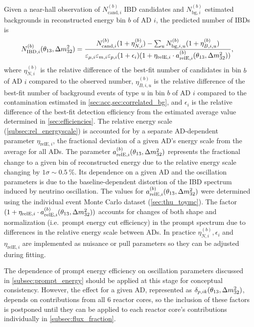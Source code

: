 Given a near-hall observation of $N_{\text{cand},i}^{(b)}$ IBD candidates
and $N_{\text{bg},i}^{(b)}$ estimated backgrounds in reconstructed energy bin $b$
of AD $i$,
the predicted number of IBDs is
\begin{equation}\label{eq:near_hall_bg_eff}
    N_{\text{IBD},i}^{(b)}(\theta_{13}, \Delta m^2_{32}) =
    \frac{N_{\text{cand},i}^{(b)}(1+\eta_{N,i}^{(b)})
        - \sum_u N_{\text{bg},i,u}^{(b)}(1+\eta_{B,i,u}^{(b)})}{
        \varepsilon_{\mu,i}\varepsilon_{m,i}\varepsilon_{p,i}(1+\epsilon_i)
        (1 + \eta_{\text{relE},i}\cdot a_{\text{relE},i}^{(b)}(\theta_{13}, \Delta m^2_{32}))
    },
\end{equation}
where $\eta_{N,i}^{(b)}$ is the relative difference
of the best-fit number of candidates in bin $b$ of AD $i$
compared to the observed number,
$\eta_{B,i,u}^{(b)}$ is the relative difference
of the best-fit number of background events of type $u$ in bin $b$ of AD $i$
compared to the contamination estimated in \cref{sec:acc,sec:correlated_bg},
and $\epsilon_i$ is the relative difference of the best-fit detection efficiency
from the estimated average value determined in \cref{sec:efficiencies}.
The relative energy scale (\cref{subsec:rel_energyscale})
is accounted for by a separate AD-dependent parameter $\eta_{\text{relE},i}$,
the fractional deviation of a given AD's energy scale
from the average for all ADs.
The parameter $a_{\text{relE},i}^{(b)}(\theta_{13}, \Delta m^2_{32})$
represents the fractional change to a given bin of reconstructed energy
due to the relative energy scale changing by $1\sigma \sim \SI{0.5}{\percent}$.
Its dependence on a given AD and the oscillation parameters is
due to the baseline-dependent distortion of the IBD spectrum
induced by neutrino oscillation.
The values for $a_{\text{relE},i}^{(b)}(\theta_{13}, \Delta m^2_{32})$ were determined using
the individual event Monte Carlo dataset (\cref{sec:thu_toymc}).
The factor $(1 + \eta_{\text{relE},i}\cdot a_{\text{relE},i}^{(b)}(\theta_{13},\Delta m^2_{32}))$
accounts for changes of
both shape and normalization (i.e.\ prompt energy cut efficiency)
in the prompt spectrum
due to differences in the relative energy scale between ADs.
In practice $\eta_{N,i}^{(b)},\epsilon_i$ and $\eta_{\text{relE},i}$
are implemented as nuisance or pull parameters
so they can be adjusted during fitting.

The dependence of prompt energy efficiency on oscillation parameters
discussed in \cref{subsec:prompt_energy}
should be applied at this stage for conceptual consistency.
However, the effect for a given AD, represented as $\delta_{p,ik}(\theta_{13}, \Delta m^2_{32})$,
depends on contributions from all 6 reactor cores,
so the inclusion of these factors is postponed
until they can be applied to each reactor core's contributions
individually in \cref{subsec:flux_fraction}.

